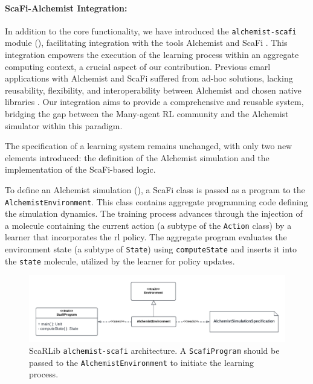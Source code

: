 \documentclass[12pt,a4paper,openright,twoside]{book}
\newcommand*{\scafi}{ScaFi}
\newcommand{\scarlib}{ScaRLib}
\begin{document}
\paragraph{ScaFi-Alchemist Integration:} In addition to the core functionality, we have introduced the \texttt{alchemist-scafi} module (), facilitating integration with the tools Alchemist \cite{DBLP:journals/jos/PianiniMV13} and \scafi{} \cite{Casadei2022}. This integration empowers the execution of the learning process within an aggregate computing context, a crucial aspect of our contribution. Previous \ac{cmarl} applications with Alchemist and ScaFi suffered from ad-hoc solutions, lacking reusability, flexibility, and interoperability between Alchemist and chosen native libraries \cite{DBLP:conf/acsos/AguzziCV22}. Our integration aims to provide a comprehensive and reusable system, bridging the gap between the Many-agent RL community and the Alchemist simulator within this paradigm.

The specification of a learning system remains unchanged, with only two new elements introduced: the definition of the Alchemist simulation and the implementation of the \scafi{}-based logic.

To define an Alchemist simulation (), a \scafi{} class is passed as a program to the \texttt{AlchemistEnvironment}. This class contains aggregate programming code defining the simulation dynamics. The training process advances through the injection of a molecule containing the current action (a subtype of the \texttt{Action} class) by a learner that incorporates the \ac{rl} policy. The aggregate program evaluates the environment state (a subtype of \texttt{State}) using \texttt{computeState} and inserts it into the \texttt{state} molecule, utilized by the learner for policy updates.

\begin{figure}[t]
    \centering
    \includegraphics[width=\textwidth]{img/alchemist-scafi-arc.pdf}
    \caption{\scarlib{} \texttt{alchemist-scafi} architecture. A \texttt{ScafiProgram} should be passed to the \texttt{AlchemistEnvironment} to initiate the learning process.}
    \label{fig:alchemist-arc}
\end{figure}
\end{document}
